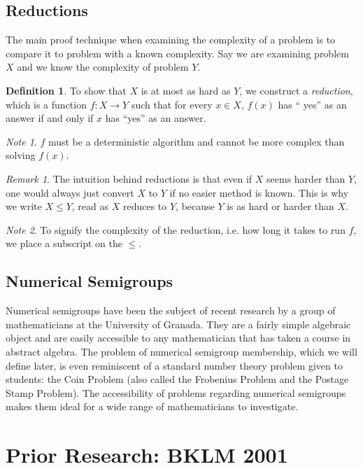 \documentclass[a4paper,12pt]{article}
\theoremstyle{plain}
\theoremstyle{definition}
\newtheorem{defn}{Definition}
\theoremstyle{remark}
\newtheorem*{note}{Note}
\newtheorem{remark}{Remark}
\begin{document}
\subsection{Reductions}
The main proof technique when examining the complexity of a problem is to compare it to problem with a known complexity. Say we are examining problem $X$ and we know the complexity of problem $Y$.
\begin{defn}
  To show that $X$ is at most as hard as $Y$, we construct a \textit{reduction}, which is a function $f:X\to Y$ such that for every $x\in X$, $f(x)$ has `` yes'' as an answer if and only if $x$ has ``yes'' as an answer.
\end{defn}
\begin{note}
  $f$ must be a deterministic algorithm and cannot be more complex than solving $f(x)$.
\end{note}
\begin{remark}
  The intuition behind reductions is that even if $X$ seems harder than $Y$, one would always just convert $X$ to $Y$ if no easier method is known. This is why we write $X\leq Y$, read as $X$ reduces to $Y$, because $Y$ is as hard or harder than $X$.
\end{remark}
\begin{note}
  To signify the complexity of the reduction, i.e. how long it takes to run $f$, we place a subscript on the $\leq$.
\end{note}

\subsection{Numerical Semigroups}
Numerical semigroups have been the subject of recent research by a group of mathematicians at the University of Granada. \cite{garcia2006numerical} They are a fairly simple algebraic object and are easily accessible to any mathematician that has taken a course in abstract algebra. The problem of numerical semigroup membership, which we will define later, is even reminiscent of a standard number theory problem given to students: the Coin Problem (also called the Frobenius Problem and the Postage Stamp Problem). The accessibility of problems regarding numerical semigroups makes them ideal for a wide range of mathematicians to investigate.

\section{Prior Research: BKLM 2001}
\cite{Barrington2001}
\end{document}
